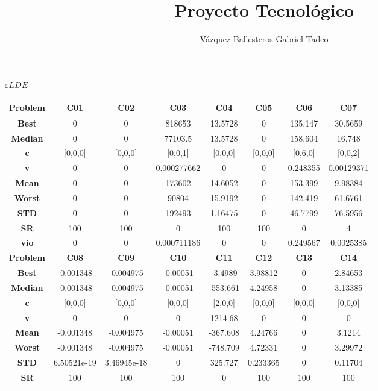\documentclass{IEEEtran}
\title{Proyecto Tecnológico}
\author{Vázquez Ballesteros Gabriel Tadeo}
\begin{document}
\onecolumn

\begin{center}
$\varepsilon LDE$\\
  \begin{tabular}{|c|c|c|c|c|c|c|c|}
    \hline 
    \textbf{Problem} & \textbf{C01} & \textbf{C02} & \textbf{C03} & \textbf{C04} & \textbf{C05} & \textbf{C06} & \textbf{C07} \\ 
    \hline\hline 
    \textbf{Best} & 0 & 0 & 818653 & 13.5728 & 0 & 135.147 & 30.5659\\ 
    \textbf{Median} & 0 & 0 & 77103.5 & 13.5728 & 0 & 158.604 & 16.748\\ 
    \textbf{c} & [0,0,0] & [0,0,0] & [0,0,1] & [0,0,0] & [0,0,0] & [0,6,0] & [0,0,2]\\ 
    \textbf{v} & 0 & 0 & 0.000277662 & 0 & 0 & 0.248355 & 0.00129371\\ 
    \textbf{Mean} & 0 & 0 & 173602 & 14.6052 & 0 & 153.399 & 9.98384\\ 
    \textbf{Worst} & 0 & 0 & 90804 & 15.9192 & 0 & 142.419 & 61.6761\\ 
    \textbf{STD} & 0 & 0 & 192493 & 1.16475 & 0 & 46.7799 & 76.5956\\ 
    \textbf{SR} & 100 & 100 & 0 & 100 & 100 & 0 & 4\\ 
    \textbf{vio} & 0 & 0 & 0.000711186 & 0 & 0 & 0.249567 & 0.0025385\\ 
    \hline 
    \hline 
    \textbf{Problem} & \textbf{C08} & \textbf{C09} & \textbf{C10} & \textbf{C11} & \textbf{C12} & \textbf{C13} & \textbf{C14} \\ 
    \hline\hline 
    \textbf{Best} & -0.001348 & -0.004975 & -0.00051 & -3.4989 & 3.98812 & 0 & 2.84653\\ 
    \textbf{Median} & -0.001348 & -0.004975 & -0.00051 & -553.661 & 4.24958 & 0 & 3.13385\\ 
    \textbf{c} & [0,0,0] & [0,0,0] & [0,0,0] & [2,0,0] & [0,0,0] & [0,0,0] & [0,0,0]\\ 
    \textbf{v} & 0 & 0 & 0 & 1214.68 & 0 & 0 & 0\\ 
    \textbf{Mean} & -0.001348 & -0.004975 & -0.00051 & -367.608 & 4.24766 & 0 & 3.1214\\ 
    \textbf{Worst} & -0.001348 & -0.004975 & -0.00051 & -748.709 & 4.72331 & 0 & 3.29972\\ 
    \textbf{STD} & 6.50521e-19 & 3.46945e-18 & 0 & 325.727 & 0.233365 & 0 & 0.11704\\ 
    \textbf{SR} & 100 & 100 & 100 & 0 & 100 & 100 & 100\\ 

\end{tabular}
\end{center}
\end{document}

